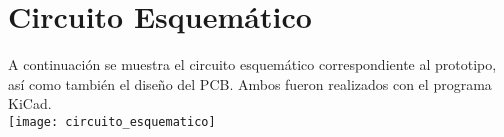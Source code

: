 \section{Circuito Esquemático}
A continuación se muestra el circuito esquemático correspondiente al prototipo, así como también el diseño del PCB. Ambos fueron realizados con el programa KiCad.\\
 
\hspace{-1.8cm}
\texttt{[image: circuito\_esquematico]}



\pagebreak
